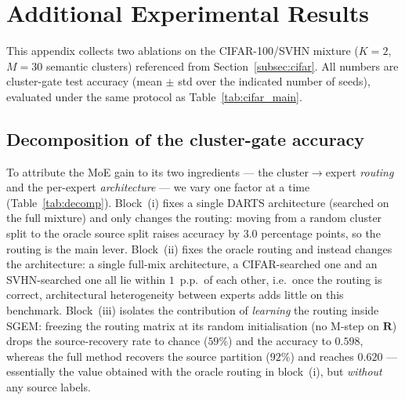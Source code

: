 \section{Additional Experimental Results}
\label{app:experiments}

This appendix collects two ablations on the CIFAR-100/SVHN mixture
($K=2$, $M=30$ semantic clusters) referenced from
Section~\ref{subsec:cifar}. All numbers are cluster-gate test accuracy
(mean $\pm$ std over the indicated number of seeds), evaluated under the
same protocol as Table~\ref{tab:cifar_main}.

\subsection{Decomposition of the cluster-gate accuracy}
\label{app:decomp}

To attribute the MoE gain to its two ingredients --- the cluster$\to$expert
\emph{routing} and the per-expert \emph{architecture} --- we vary one
factor at a time (Table~\ref{tab:decomp}). Block~(i) fixes a single
DARTS architecture (searched on the full mixture) and only changes the
routing: moving from a random cluster split to the oracle source split
raises accuracy by $3.0$ percentage points, so the routing is the main
lever. Block~(ii) fixes the oracle routing and instead changes the
architecture: a single full-mix architecture, a CIFAR-searched one and an
SVHN-searched one all lie within $1$~p.p.\ of each other, i.e.\ once the
routing is correct, architectural heterogeneity between experts adds
little on this benchmark. Block~(iii) isolates the contribution of
\emph{learning} the routing inside SGEM: freezing the routing matrix at
its random initialisation (no M-step on $\mathbf{R}$) drops the
source-recovery rate to chance ($59\%$) and the accuracy to $0.598$,
whereas the full method recovers the source partition ($92\%$) and
reaches $0.620$ --- essentially the value obtained with the oracle
routing in block~(i), but \emph{without} any source labels.

